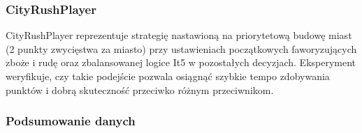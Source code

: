 \documentclass[polish,inz,longabstract]{iithesis}
\begin{document}
\pagebreak

\subsubsection{CityRushPlayer}

CityRushPlayer reprezentuje strategię nastawioną na priorytetową budowę miast (2 punkty zwycięstwa za miasto) przy ustawieniach początkowych faworyzujących zboże i rudę oraz zbalansowanej logice It5 w pozostałych decyzjach. Eksperyment weryfikuje, czy takie podejście pozwala osiągnąć szybkie tempo zdobywania punktów i dobrą skuteczność przeciwko różnym przeciwnikom.

\subsubsection{Podsumowanie danych}
\begin{table}[H]
\centering
\caption{Podsumowanie wyników CityRushPlayer – skuteczność i tempo}
\medskip
\label{tab:cityrush-main}
\small
{}
\end{table}

\pagebreak
\end{document}
